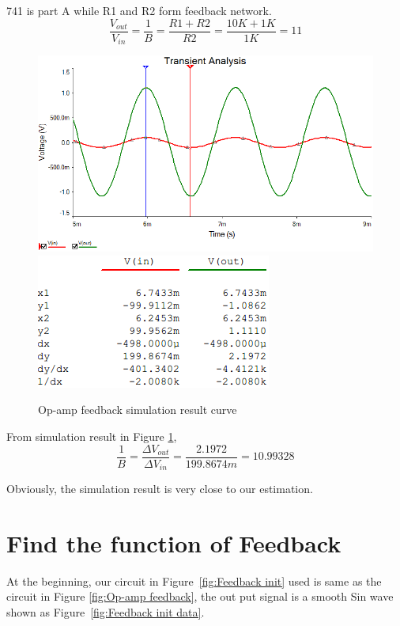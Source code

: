 741 is part A while R1 and R2 form feedback network. 
\[ \frac{V_{out}}{V_{in}} = \frac{1}{B} = \frac{R1 + R2}{R2} = \frac{10K + 1K}{1K} = 11 \]
 
\begin{figure}[htbp]
	\centering 
	\includegraphics[scale=0.6]{"../Photo/Chap2/Op-amp feedback simulation wave"}\\[0.5cm]
	\includegraphics[scale =1]{"../Photo/Chap2/Op-amp feedback simulation cursor data"}
	\caption{Op-amp  feedback simulation result curve}
	\label{fig:Op-amp  feedback simulation result }
\end{figure}

From simulation result in Figure \ref{fig:Op-amp  feedback simulation result }, 
\[ \frac{1}{B} = \frac{\Delta V_{out}}{\Delta V_{in}} =  \frac{2.1972}{199.8674m} =  10.99328 \]
 
Obviously, the simulation result is very close to our estimation.

\section{Find the function of Feedback }

At the beginning, our circuit in Figure~\ref{fig:Feedback init} used is same as the circuit in Figure \ref{fig:Op-amp feedback}, the out put signal is a smooth Sin wave shown as Figure~\ref{fig:Feedback init data}.

